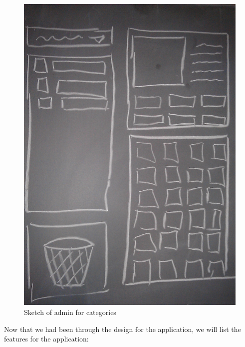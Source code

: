 \begin{figure}[htbp]
	\centering
		\includegraphics[scale=0.10]{input/images/admincate.jpg}
	\caption{Sketch of admin for categories}
	\label{fig:admincate}
\end{figure}

Now that we had been through the design for the application, we will list the features for the application: 

